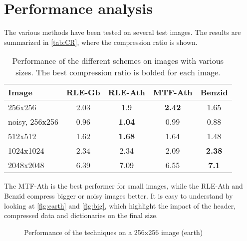 \vspace{-0.5cm}
\section{Performance analysis}

The various methods have been tested on several test images. The results are summarized in \autoref{tab:CR}, where the compression ratio is shown.

\begin{table}[h]
	\centering
	\begin{tabular}{|l|cccc|}
		\hline
		Image & RLE-Gb & RLE-Ath & MTF-Ath & Benzid \\ \hline
		256x256 & 2.03  & 1.9 & \textbf{2.42} & 1.65      \\
		noisy, 256x256 & 0.96 & \textbf{1.04} & 0.99   & 0.88   \\
		512x512  & 1.62  & \textbf{1.68} & 1.64 & 1.48 \\
		1024x1024 & 2.34 & 2.34 & 2.09 & \textbf{2.38}\\
		2048x2048 & 6.39 & 7.09 & 6.55 & \textbf{7.1} \\ \hline
	\end{tabular}
	\caption{Performance of the different schemes on images with various sizes. The best compression ratio is bolded for each image.}
	\label{tab:CR}
\end{table}

\vspace*{-0.6cm}
The MTF-Ath is the best performer for small images, while the RLE-Ath and Benzid compress bigger or noisy images better. It is easy to understand by looking at \autoref{fig:earth} and \autoref{fig:big}, which highlight the impact of the header, compressed data and dictionaries on the final size.

\begin{figure}[h]
	\centering
	\caption{Performance of the techniques on a 256x256 image (earth)}
	\label{fig:earth}
\end{figure}


